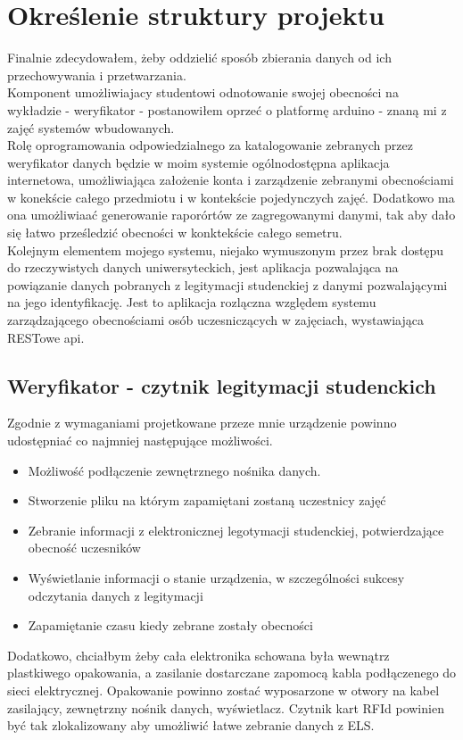 \documentclass[declaration,shortabstract, mgr]{iithesis}
\begin{document}
\chapter{Określenie struktury projektu}
\indent Finalnie zdecydowałem, żeby oddzielić sposób zbierania danych od ich przechowywania i przetwarzania. \\
\indent Komponent umożliwiajacy studentowi odnotowanie swojej obecności na wykładzie - weryfikator - postanowiłem oprzeć o platformę arduino - znaną mi z zajęć systemów wbudowanych. \\
\indent Rolę oprogramowania odpowiedzialnego za katalogowanie zebranych przez weryfikator danych będzie w moim systemie ogólnodostępna aplikacja internetowa, umożliwiająca założenie konta i zarządzenie zebranymi obecnościami w konekście całego przedmiotu  i w kontekście pojedynczych zajęć. Dodatkowo ma ona umożliwiaać generowanie raporórtów ze zagregowanymi danymi, tak aby dało się łatwo prześledzić obecności w konktekście całego semetru. \\
\indent Kolejnym elementem mojego systemu, niejako wymuszonym przez brak dostępu do rzeczywistych danych uniwersyteckich, jest aplikacja pozwalająca na powiązanie danych pobranych z legitymacji studenckiej z danymi pozwalającymi na jego identyfikację. Jest to aplikacja rozlączna względem systemu zarządzającego obecnościami osób uczesniczących w zajęciach, wystawiająca RESTowe api. 
\section{Weryfikator - czytnik legitymacji studenckich}
\indent Zgodnie z wymaganiami projetkowane przeze mnie urządzenie powinno udostępniać co najmniej następujące możliwości.
\begin{itemize}
\item Możliwość podłączenie zewnętrznego nośnika danych.
\item Stworzenie pliku na którym zapamiętani zostaną uczestnicy zajęć
\item Zebranie informacji z elektronicznej legotymacji studenckiej, potwierdzające obecność uczesników
\item Wyświetlanie informacji o stanie urządzenia, w szczególności sukcesy odczytania danych z legitymacji
\item Zapamiętanie czasu kiedy zebrane zostały obecności
\end{itemize}
\indent Dodatkowo, chciałbym żeby cała elektronika schowana była wewnątrz plastkiwego opakowania, a zasilanie dostarczane zapomocą kabla podłączenego do sieci elektrycznej. Opakowanie powinno zostać wyposarzone w otwory na kabel zasilający, zewnętrzny nośnik danych, wyświetlacz. Czytnik kart RFId powinien być tak zlokalizowany aby umożliwić łatwe zebranie danych z ELS.
\end{document}
